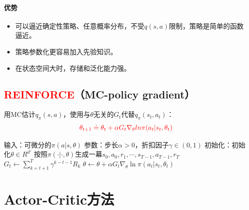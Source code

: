 \documentclass[
12pt, %
a4paper, 
oneside, %
]{scrartcl}
\begin{document}
\paragraph{优势}
\begin{itemize}
\item 可以逼近确定性策略、任意概率分布，不受$ q(s, a) $限制，策略是简单的函数逼近。
\item 策略参数化更容易加入先验知识。
\item 在状态空间大时，存储和泛化能力强。
\end{itemize}
\subsection[REINFORCE]{\textcolor{red}{REINFORCE}（MC-policy gradient）}
用MC估计$ q_\pi(s, a) $，使用与$ \theta $无关的$ G_t $代替$ q_\pi(s_t, a_t) $：
$$ \textcolor{red}{\theta_{t + 1} \doteq \theta_t + \alpha G_t \nabla_{\theta} ln \pi (a_t|s_t, \theta_t)} $$
\begin{myalgorithm}[REINFORCE]
\State 输入：可微分的$ \pi(a|s, \theta) $
\State 参数：步长$ \alpha > 0 $，折扣因子$ \gamma \in (0, 1) $
\State 初始化：初始化$ \theta \in R^{d'} $
\Loop
\State 按照$ \pi(\cdot|\cdot, \theta) $生成一幕$ s_0, a_0, r_1, \cdots, s_{T - 1}, a_{T - 1}, r_T $
\State $ G_t \gets \sum_{k = t + 1}^{T} \gamma^{k - t - 1}R_k $
\State $ \theta \gets \theta + \alpha G_t \nabla_{\theta} \ln \pi(a_t|s_t, \theta_t) $
\EndFor
\EndLoop
\end{myalgorithm}
\section{Actor-Critic方法}
\end{document}
